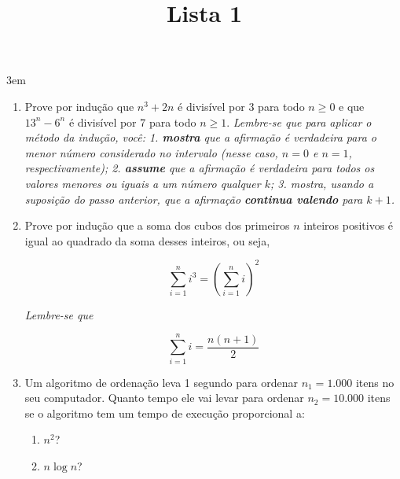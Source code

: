 \documentclass[a4paper,10pt]{article}
\title{Lista 1}
\begin{document}
\maketitle

\emergencystretch 3em

\begin{multicols*}{2}
\setlength{\leftmargini}{0pt}
\begin{enumerate}
  \item  Prove por indução que $n^3 + 2n$ é divisível por 3 para todo $n \geq 0$ e que $13^n - 6^n$ é divisível por 7 para todo $n \geq 1$. \textit{Lembre-se que para aplicar o método da indução, você: 1. \textbf{mostra} que a afirmação é verdadeira para o menor número considerado no intervalo (nesse caso, $n = 0$ e $n = 1$, respectivamente); 2. \textbf{assume} que a afirmação é verdadeira para todos os valores menores ou iguais a um número qualquer $k$; 3. mostra, usando a suposição do passo anterior, que a afirmação \textbf{continua valendo} para $k + 1$.}

  \item  Prove por indução que a soma dos cubos dos primeiros $n$ inteiros positivos é igual ao quadrado da soma desses inteiros, ou seja,

  \begin{equation*}
    \sum_{i = 1}^{n} i^3 = \left(\sum_{i = 1}^{n} i\right)^2
  \end{equation*}

  \textit{Lembre-se que}

  \begin{equation*}
    \sum_{i = 1}^{n} i = \frac{n (n+1)}{2}
  \end{equation*}

  \item Um algoritmo de ordenação leva 1 segundo para ordenar $n_1 = 1.000$ itens no seu computador. Quanto tempo ele vai levar para ordenar $n_2 = 10.000$ itens se o algoritmo tem um tempo de execução proporcional a:

    \begin{enumerate}
      \item $n^2$?
      \item $n \log{n}$?
    \end{enumerate}


\end{enumerate}
\end{multicols*}
\end{document}
